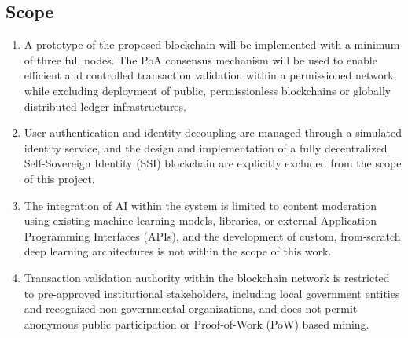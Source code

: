 \subsection{Scope}

\begin{enumerate}
   \item A prototype of the proposed blockchain will be implemented with a minimum of three full nodes. The \ac{PoA} consensus mechanism will be used to enable efficient and controlled transaction validation within a permissioned network, while excluding deployment of public, permissionless blockchains or globally distributed ledger infrastructures. 
   
   \item User authentication and identity decoupling are managed through a simulated identity service, and the design and implementation of a fully decentralized Self-Sovereign Identity (SSI) blockchain are explicitly excluded from the scope of this project.
   

   
   \item The integration of \ac{AI} within the system is limited to content moderation using existing machine learning models, libraries, or external Application Programming Interfaces (\ac{API}s), and the development of custom, from-scratch deep learning architectures is not within the scope of this work.
   
   
   \item Transaction validation authority within the blockchain network is restricted to pre-approved institutional stakeholders, including local government entities and recognized non-governmental organizations, and does not permit anonymous public participation or Proof-of-Work (\ac{PoW}) based mining.
   


\end{enumerate}
